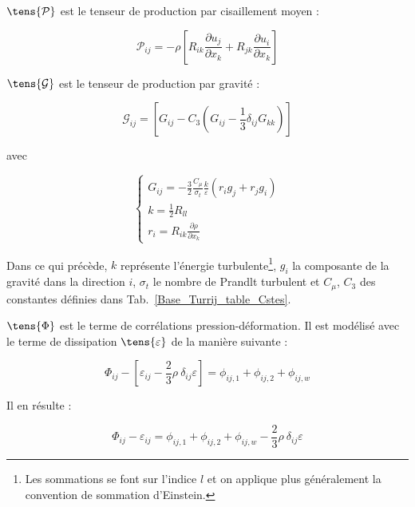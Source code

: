 $\tens{\mathcal{P}}$ est le tenseur de production par cisaillement moyen :

\begin{equation}
\displaystyle \mathcal{P}_{ij} = \displaystyle -\rho \left[ R_{ik} \frac{\partial u_j}{\partial x_k} + R_{jk} \frac{\partial u_i}{\partial x_k} \right]
\end{equation}


$\tens{\mathcal{G}}$ est le tenseur de production par gravit\'e :

\begin{equation}
\displaystyle
\mathcal{G}_{ij}= \left[ G_{ij} - C_3 (G_{ij}-\frac{1}{3} \delta_{ij} G_{kk}) \right]
\end{equation}

avec

\begin{equation}
\left\{
\begin{array} {c}
\displaystyle G_{ij} = - \frac{3}{2} \frac{C_{\mu}}{\sigma_{t}} \frac{k}{\varepsilon} (r_i g_j + r_j g_i) \\
\displaystyle k = \frac{1}{2} R_{ll} \\
\displaystyle r_i = R_{ik} \frac{\partial \rho}{\partial x_k}
\end{array}\right.
\end{equation}

Dans ce qui pr\'ec\`ede, $k$ repr\'esente l'\'energie turbulente\footnote{Les
sommations se font sur l'indice $l$ et on applique plus
g\'en\'eralement la convention de sommation d'Einstein.}, $g_i$ la composante de
la gravit\'e dans la direction $i$, $\sigma_{t}$ le nombre de Prandlt turbulent  et $C_{\mu}$, $C_3$ des constantes d\'efinies dans Tab.~\ref{Base_Turrij_table_Cstes}.


$\tens{\Phi}$ est le terme de corr\'elations pression-d\'eformation. Il est mod\'elis\'e avec le terme de dissipation $\tens{\varepsilon}$ de la mani\`ere suivante :

\begin{equation}
\displaystyle
\Phi_{ij} - [\varepsilon_{ij}- \frac{2}{3} \rho \ \delta_{ij} \varepsilon] = \phi_{ij,1} + \phi_{ij,2} + \phi_{ij,w}
\end{equation}

Il en r\'esulte :

\begin{equation}
\displaystyle
\Phi_{ij} - \varepsilon_{ij} = \phi_{ij,1} + \phi_{ij,2} + \phi_{ij,w}  -\frac{2}{3} \rho \ \delta_{ij} \varepsilon
\end{equation}

